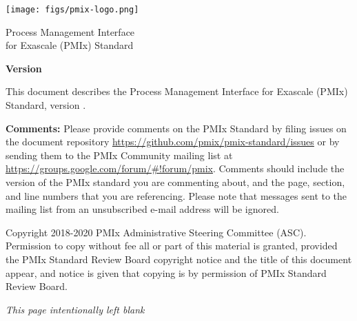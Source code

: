 
  \begin{titlepage}
    \begin{flushleft}
     \hspace{-6em} \texttt{[image: figs/pmix-logo.png]}
    \end{flushleft}

    \begin{adjustwidth}{-0.75in}{0in}
    \begin{center}
      \Huge
      \textsf{Process Management Interface\\for Exascale (PMIx) Standard}

      \vspace{1.0in}
	  \huge
      \textbf{Version \VER{}}

      \vspace{0.15in}
	  \Large
      \textbf{\VERDATE}

    \end{center}
    \end{adjustwidth}

    \vspace{1.2in}

\par
This document describes the Process Management Interface for Exascale (PMIx) Standard, version \VER{}.

\par
\textbf{Comments:}
Please provide comments on the PMIx Standard by filing issues on the document repository \url{https://github.com/pmix/pmix-standard/issues} or by sending them to the PMIx Community mailing list at \url{https://groups.google.com/forum/#!forum/pmix}.
Comments should include the version of the PMIx standard you are commenting about, and the page, section, and line numbers that you are referencing.
Please note that messages sent to the mailing list from an unsubscribed e-mail address will be ignored.

\vfill

\begin{adjustwidth}{0pt}{1em}\setlength{\parskip}{0.25\baselineskip}%
Copyright \textsuperscript{\textcopyright} 2018-2020 PMIx Administrative Steering Committee (ASC).\\
Permission to copy without fee all or part of this material is granted,
provided the PMIx Standard Review Board copyright notice and
the title of this document appear, and notice is given that copying is by
permission of PMIx Standard Review Board.
\end{adjustwidth}

  \end{titlepage}

\clearpage
\thispagestyle{empty}
\phantom{a}
\begin{center}
\emph{This page intentionally left blank}
\end{center}

\vfill

